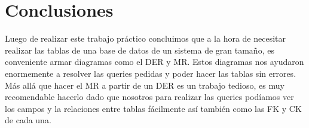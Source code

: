 \documentclass[a4paper, 10pt, twoside]{article}
\begin{document}
\section{Conclusiones}

Luego de realizar este trabajo pr\'actico concluimos que a la hora de necesitar realizar las tablas de una base de datos de un sistema de gran tama\~no, es conveniente armar diagramas como el DER y MR. 
Estos diagramas nos ayudaron enormemente a resolver las queries pedidas y poder hacer las tablas sin errores. 
M\'as all\'a que hacer el MR a partir de un DER es un trabajo tedioso, es muy recomendable hacerlo dado que nosotros para realizar las queries pod\'iamos ver los campos y la relaciones entre tablas f\'acilmente as\'i tambi\'en como las FK y CK de cada una.
\end{document}

